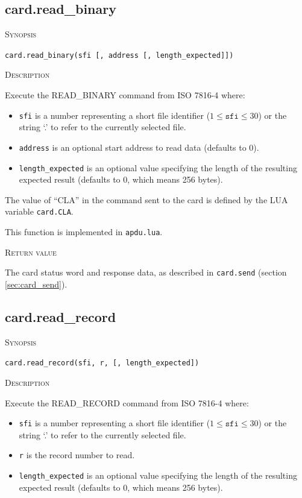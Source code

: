 \documentclass[11pt]{report}
\newcommand{\mansection}[1]{\vspace{0.5em}\par\noindent\textsc{#1}\vspace{0.5em}\par}
\newcommand{\syn}[1]{\texttt{#1}}
\begin{document}
\subsection{card.read\_binary}

\mansection{Synopsis}
\syn{card.read\_binary(sfi [, address [, length\_expected]])}


\mansection{Description}
  Execute the READ\_BINARY command from ISO 7816-4 where:
  \begin{itemize}
  \item{\syn{sfi} is a number representing a short file identifier ($1 \le \syn{sfi} \le 30$) or the string `.' to refer to the currently selected file.}
  \item{\syn{address} is an optional start address to read data (defaults to 0).}
  \item{\syn{length\_expected} is an optional value specifying the length of the resulting expected result (defaults to 0, which means 256 bytes).}
  \end{itemize}

  The value of ``CLA'' in the command sent to the card is defined by the LUA variable \syn{card.CLA}.

  This function is implemented in \syn{apdu.lua}.

\mansection{Return value}
  The card status word and response data, as described in \syn{card.send} (section \ref{sec:card_send}).


\subsection{card.read\_record}

\mansection{Synopsis}
\syn{card.read\_record(sfi, r, [, length\_expected])}


\mansection{Description}
  Execute the READ\_RECORD command from ISO 7816-4 where:
  \begin{itemize}
  \item{\syn{sfi} is a number representing a short file identifier ($1 \le \syn{sfi} \le 30$) or the string `.' to refer to the currently selected file.}
  \item{\syn{r} is the record number to read.}
  \item{\syn{length\_expected} is an optional value specifying the length of the resulting expected result (defaults to 0, which means 256 bytes).}
  \end{itemize}
\end{document}
